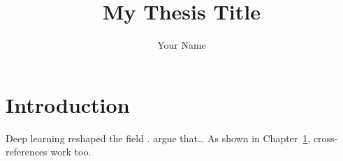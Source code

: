 \documentclass[11pt]{report}  %
\title{My Thesis Title}
\author{Your Name}
\begin{document}
\maketitle
\tableofcontents

\chapter{Introduction}\label{ch:intro}
Deep learning reshaped the field \citep{lecun2015deep}.
\citet{lecun2015deep} argue that\ldots{}
As shown in Chapter~\ref{ch:intro}, cross-references work too.

\end{document}
